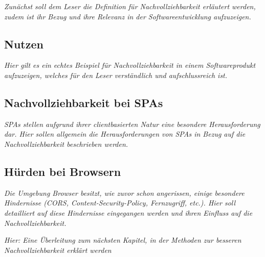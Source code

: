 \textit{Zunächst soll dem Leser die Definition für Nachvollziehbarkeit erläutert werden, zudem ist ihr Bezug und ihre Relevanz in der Softwareentwicklung aufzuzeigen.}
	
\subsection{Nutzen}
	
\textit{Hier gilt es ein echtes Beispiel für Nachvollziehbarkeit in einem Softwareprodukt aufzuzeigen, welches für den Leser verständlich und aufschlussreich ist.}
	
\subsection{Nachvollziehbarkeit bei SPAs}
	
\textit{SPAs stellen aufgrund ihrer clientbasierten Natur eine besondere Herausforderung dar. Hier sollen allgemein die Herausforderungen von SPAs in Bezug auf die Nachvollziehbarkeit beschrieben werden.}

\subsection{Hürden bei Browsern}

\textit{Die Umgebung Browser besitzt, wie zuvor schon angerissen, einige besondere Hindernisse (CORS, Content-Security-Policy, Fernzugriff, etc.). Hier soll detailliert auf diese Hindernisse eingegangen werden und ihren Einfluss auf die Nachvollziehbarkeit.}

\textit{Hier: Eine Überleitung zum nächsten Kapitel, in der Methoden zur besseren Nachvollziehbarkeit erklärt werden}